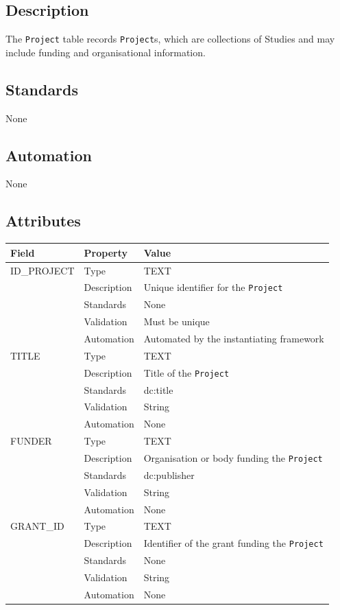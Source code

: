 \documentclass[
]{article}
\newcounter{none} %
\begin{document}
\subsection{Description}\label{description-25}

The \texttt{Project} table records \texttt{Project}s, which are
collections of Studies and may include funding and organisational
information.

\subsection{Standards}\label{standards-27}

None

\subsection{Automation}\label{automation-27}

None

\subsection{Attributes}\label{attributes-24}

{\def\LTcaptype{none} %
\begin{longtable}[]{@{}lll@{}}
\toprule\noalign{}
Field & Property & Value \\
\midrule\noalign{}
\endhead
\bottomrule\noalign{}
\endlastfoot
ID\_PROJECT & Type & TEXT \\
& Description & Unique identifier for the \texttt{Project} \\
& Standards & None \\
& Validation & Must be unique \\
& Automation & Automated by the instantiating framework \\
TITLE & Type & TEXT \\
& Description & Title of the \texttt{Project} \\
& Standards & dc:title \\
& Validation & String \\
& Automation & None \\
FUNDER & Type & TEXT \\
& Description & Organisation or body funding the \texttt{Project} \\
& Standards & dc:publisher \\
& Validation & String \\
& Automation & None \\
GRANT\_ID & Type & TEXT \\
& Description & Identifier of the grant funding the \texttt{Project} \\
& Standards & None \\
& Validation & String \\
& Automation & None \\
\end{longtable}
}
\end{document}
